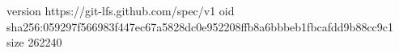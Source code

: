 version https://git-lfs.github.com/spec/v1
oid sha256:059297f566983f447ec67a5828dc0e952208ffb8a6bbbeb1fbcafdd9b88cc9c1
size 262240
